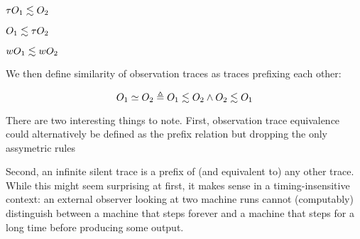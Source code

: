 \documentclass[acmsmall,review,anonymous]{acmart}\settopmatter{printfolios=true,printccs=false,printacmref=false}
\begin{document}
\begin{minipage}{.3\textwidth}
         {\(\tau O_1 \lesssim O_2\)}
\end{minipage}
\begin{minipage}{.3\textwidth}
         {\(O_1 \lesssim \tau O_2\)}
\end{minipage}
\begin{minipage}{.3\textwidth}
         {\(wO_1 \lesssim wO_2\)}
\end{minipage}


We then define similarity of observation traces as traces prefixing each other:

\[O_1 \simeq O_2 \triangleq O_1 \lesssim O_2 \land O_2 \lesssim O_1\]

 There are two interesting things
to note.  First, observation trace equivalence could alternatively be
defined as the prefix relation but dropping the only assymetric rules

Second, an infinite silent trace is a prefix of (and equivalent to)
any other trace. While this might seem surprising at first, it makes
sense in a timing-insensitive context: an external observer looking
at two machine runs cannot (computably) distinguish between a machine that
steps forever and a machine that steps for a long time before producing
some output.

%
%
\end{document}
